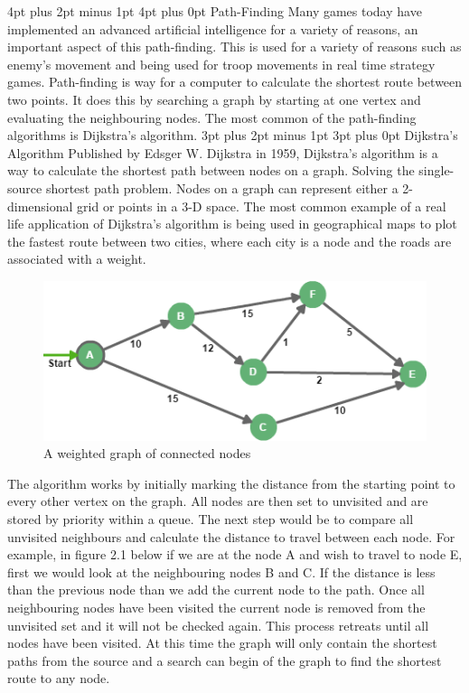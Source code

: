 \documentclass[12pt,a4paper,oneside]{book}
\makeatletter
\renewcommand\subsection{\@startsection {subsection}{1}{2mm} %
                               {3pt plus 2pt minus 1pt} %
                               {3pt plus 0pt} %
                               {\normalfont\bfseries}}
\renewcommand\section{\@startsection {section}{1}{0mm} %
                               {4pt plus 2pt minus 1pt} %
                               {4pt plus 0pt} %
                               {\bfseries}}
\makeatother
\begin{document}
\section{Path-Finding}
Many games today have implemented an advanced artificial intelligence for a variety of reasons, an important aspect of this path-finding. This is used for a variety of reasons such as enemy’s movement and being used for troop movements in real time strategy games. Path-finding is way for a computer to calculate the shortest route between two points. It does this by searching a graph by starting at one vertex and evaluating the neighbouring nodes. The most common of the path-finding algorithms is Dijkstra's algorithm.	
\subsection{Dijkstra’s Algorithm}
Published by Edsger W. Dijkstra in 1959, Dijkstra’s algorithm is a way to calculate the shortest path between nodes on a graph. Solving the single-source shortest path problem. Nodes on a graph can represent either a 2-dimensional grid or points in a 3-D space. The most common example of a real life application of Dijkstra’s algorithm is being used in geographical maps to plot the fastest route between two cities, where each city is a node and the roads are associated with a weight. 
\vspace{2mm} 
\newline
\begin{figure}[h]
	\includegraphics[width=\linewidth]{images/Dijsk.png}
	\caption{A weighted graph of connected nodes}
\end{figure}
The algorithm works by initially marking the distance from the starting point to every other vertex on the graph. All nodes are then set to unvisited and are stored  by priority within a queue. The next step would be to compare all unvisited neighbours and calculate the distance to travel between each node. For example, in figure 2.1 below if we are at the node A and wish to travel to node E, first we would look at the neighbouring nodes B and C. If the distance is less than the previous node than we add the current node to the path. Once all neighbouring nodes have been visited the current node is removed from the unvisited set and it will not be checked again. This process retreats until all nodes have been visited. At this time the graph will only contain the shortest paths from the source and a search can begin of the graph to find the shortest route to any node.
\end{document}
